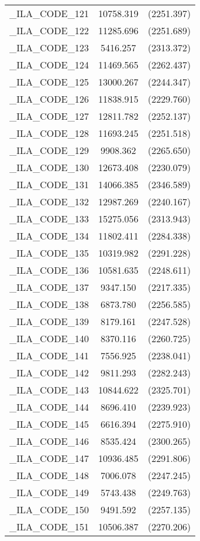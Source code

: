 {\begin{table}[htbp]
\begin{tabular}{l c c }
\_ILA\_CODE\_121  &  10758.319  & (2251.397)\\
\_ILA\_CODE\_122  &  11285.696  & (2251.689)\\
\_ILA\_CODE\_123  &  5416.257  & (2313.372)\\
\_ILA\_CODE\_124  &  11469.565  & (2262.437)\\
\_ILA\_CODE\_125  &  13000.267  & (2244.347)\\
\_ILA\_CODE\_126  &  11838.915  & (2229.760)\\
\_ILA\_CODE\_127  &  12811.782  & (2252.137)\\
\_ILA\_CODE\_128  &  11693.245  & (2251.518)\\
\_ILA\_CODE\_129  &  9908.362  & (2265.650)\\
\_ILA\_CODE\_130  &  12673.408  & (2230.079)\\
\_ILA\_CODE\_131  &  14066.385  & (2346.589)\\
\_ILA\_CODE\_132  &  12987.269  & (2240.167)\\
\_ILA\_CODE\_133  &  15275.056  & (2313.943)\\
\_ILA\_CODE\_134  &  11802.411  & (2284.338)\\
\_ILA\_CODE\_135  &  10319.982  & (2291.228)\\
\_ILA\_CODE\_136  &  10581.635  & (2248.611)\\
\_ILA\_CODE\_137  &  9347.150  & (2217.335)\\
\_ILA\_CODE\_138  &  6873.780  & (2256.585)\\
\_ILA\_CODE\_139  &  8179.161  & (2247.528)\\
\_ILA\_CODE\_140  &  8370.116  & (2260.725)\\
\_ILA\_CODE\_141  &  7556.925  & (2238.041)\\
\_ILA\_CODE\_142  &  9811.293  & (2282.243)\\
\_ILA\_CODE\_143  &  10844.622  & (2325.701)\\
\_ILA\_CODE\_144  &  8696.410  & (2239.923)\\
\_ILA\_CODE\_145  &  6616.394  & (2275.910)\\
\_ILA\_CODE\_146  &  8535.424  & (2300.265)\\
\_ILA\_CODE\_147  &  10936.485  & (2291.806)\\
\_ILA\_CODE\_148  &  7006.078  & (2247.245)\\
\_ILA\_CODE\_149  &  5743.438  & (2249.763)\\
\_ILA\_CODE\_150  &  9491.592  & (2257.135)\\
\_ILA\_CODE\_151  &  10506.387  & (2270.206)\\

\end{tabular}
\end{table}}
